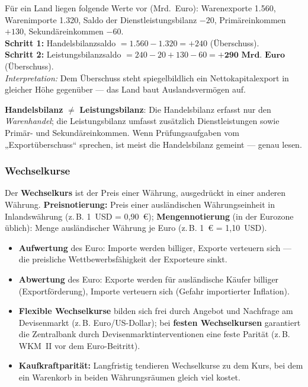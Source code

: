 \documentclass[11pt, a4paper]{article}
\begin{document}
\begin{beispiel}
Für ein Land liegen folgende Werte vor (Mrd.~Euro): Warenexporte 1.560, Warenimporte
1.320, Saldo der Dienstleistungsbilanz $-20$, Primäreinkommen $+130$, Sekundäreinkommen
$-60$.\\[0.3em]
\textbf{Schritt 1:} Handelsbilanzsaldo $= 1.560 - 1.320 = +240$ (Überschuss).\\
\textbf{Schritt 2:} Leistungsbilanzsaldo $= 240 - 20 + 130 - 60 =
\textbf{+290~Mrd.~Euro}$ (Überschuss).\\[0.3em]
\emph{Interpretation:} Dem Überschuss steht spiegelbildlich ein Nettokapitalexport in
gleicher Höhe gegenüber --- das Land baut Auslandsvermögen auf.
\end{beispiel}

\begin{achtung}
\textbf{Handelsbilanz} $\neq$ \textbf{Leistungsbilanz}: Die Handelsbilanz erfasst nur den
\emph{Warenhandel}; die Leistungsbilanz umfasst zusätzlich Dienstleistungen sowie Primär-
und Sekundäreinkommen. Wenn Prüfungsaufgaben vom „Exportüberschuss`` sprechen, ist meist
die Handelsbilanz gemeint --- genau lesen.
\end{achtung}

\subsubsection{Wechselkurse}

Der \textbf{Wechselkurs} ist der Preis einer Währung, ausgedrückt in einer anderen
Währung. \textbf{Preisnotierung:} Preis einer ausländischen Währungseinheit in Inlandswährung
(z.\,B. 1~USD = 0,90~€); \textbf{Mengennotierung} (in der Eurozone üblich): Menge
ausländischer Währung je Euro (z.\,B. 1~€ = 1,10~USD).

\begin{itemize}
  \item \textbf{Aufwertung} des Euro: Importe werden billiger, Exporte verteuern sich ---
    die preisliche Wettbewerbsfähigkeit der Exporteure sinkt.
  \item \textbf{Abwertung} des Euro: Exporte werden für ausländische Käufer billiger
    (Exportförderung), Importe verteuern sich (Gefahr importierter Inflation).
  \item \textbf{Flexible Wechselkurse} bilden sich frei durch Angebot und Nachfrage am
    Devisenmarkt (z.\,B. Euro/US-Dollar); bei \textbf{festen Wechselkursen} garantiert
    die Zentralbank durch Devisenmarktinterventionen eine feste Parität (z.\,B. WKM~II
    vor dem Euro-Beitritt).
  \item \textbf{Kaufkraftparität:} Langfristig tendieren Wechselkurse zu dem Kurs, bei
    dem ein Warenkorb in beiden Währungsräumen gleich viel kostet.
\end{itemize}
\end{document}
